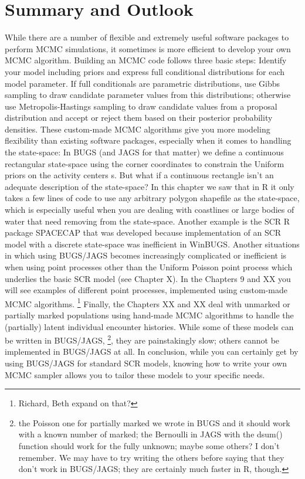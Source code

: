 \section{Summary and Outlook}
While there are a number of flexible and extremely useful software packages to perform MCMC simulations, it sometimes is more efficient to develop your own MCMC algorithm. Building an MCMC code follows three basic steps: Identify your model including priors and express full conditional distributions for each model parameter. If full conditionals are parametric distributions, use Gibbs sampling to draw candidate parameter values from this distributions; otherwise use Metropolis-Hastings sampling to draw candidate values from a proposal distribution and accept or reject them based on their posterior probability densities.
These custom-made MCMC algorithms give you more modeling flexibility than existing software packages, especially when it comes to handling the state-space: In BUGS (and JAGS for that matter) we define a continuous rectangular state-space using the corner coordinates to constrain the Uniform priors on the activity centers s. But what if a continuous rectangle isn't an adequate description of the state-space? In this chapter we saw that in R it only takes a few lines of code to use any arbitrary polygon shapefile as the state-space, which is especially useful when you are dealing with coastlines or large bodies of water that need removing from the state-space. Another example is the SCR R package SPACECAP \citep{gopalaswamy_etal:2011} that was developed because implementation of an SCR model with a discrete state-space was inefficient in WinBUGS.
Another situations in which using BUGS/JAGS becomes increasingly complicated or inefficient is when using point processes other than the Uniform Poisson point process which underlies the basic SCR model (see Chapter X). In the Chapters 9 and XX you will see examples of different point processes, implemented using custom-made MCMC algorithms. \footnote{Richard, Beth expand on that?}
Finally, the Chapters XX and XX deal with unmarked or partially marked populations using hand-made MCMC algorithms to handle the (partially) latent individual encounter histories. While some of these models can be written in BUGS/JAGS, \footnote{the Poisson one for partially marked we wrote in BUGS and it should work with a known number of marked; the Bernoulli in JAGS with the dsum() function should work for the fully unknown; maybe some others? I don’t remember. We may have to try writing the others before saying that they don’t work in BUGS/JAGS; they are certainly much faster in R, though.}, they are painstakingly slow; others cannot be implemented in BUGS/JAGS at all.
In conclusion, while you can certainly get by using BUGS/JAGS for standard SCR models, knowing how to write your own MCMC sampler allows you to tailor these models to your specific needs.
